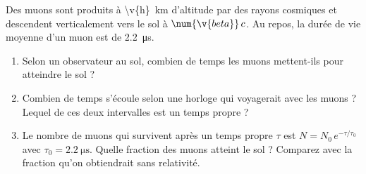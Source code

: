 Des muons sont produits à \qty{\v{h}}{km} d'altitude par des rayons cosmiques et descendent verticalement vers le sol à $\num{\v{beta}}\,c$. Au repos, la durée de vie moyenne d'un muon est de \qty{2.2}{\micro\second}.

\begin{enumerate}[label=\alph*)]
    \item Selon un observateur au sol, combien de temps les muons mettent-ils pour atteindre le sol ?
    \item Combien de temps s'écoule selon une horloge qui voyagerait avec les muons ? Lequel de ces deux intervalles est un temps propre ?
    \item Le nombre de muons qui survivent après un temps propre $\tau$ est $N = N_0\,e^{-\tau/\tau_0}$ avec $\tau_0 = \qty{2.2}{\micro\second}$. Quelle fraction des muons atteint le sol ? Comparez avec la fraction qu'on obtiendrait sans relativité.
\end{enumerate}
